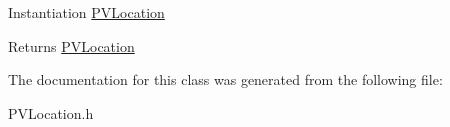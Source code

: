 Instantiation \hyperlink{interface_p_v_location}{P\+V\+Location}

\begin{DoxyReturn}{Returns}
\hyperlink{interface_p_v_location}{P\+V\+Location} 
\end{DoxyReturn}


The documentation for this class was generated from the following file\+:\begin{DoxyCompactItemize}
\item 
P\+V\+Location.\+h\end{DoxyCompactItemize}
